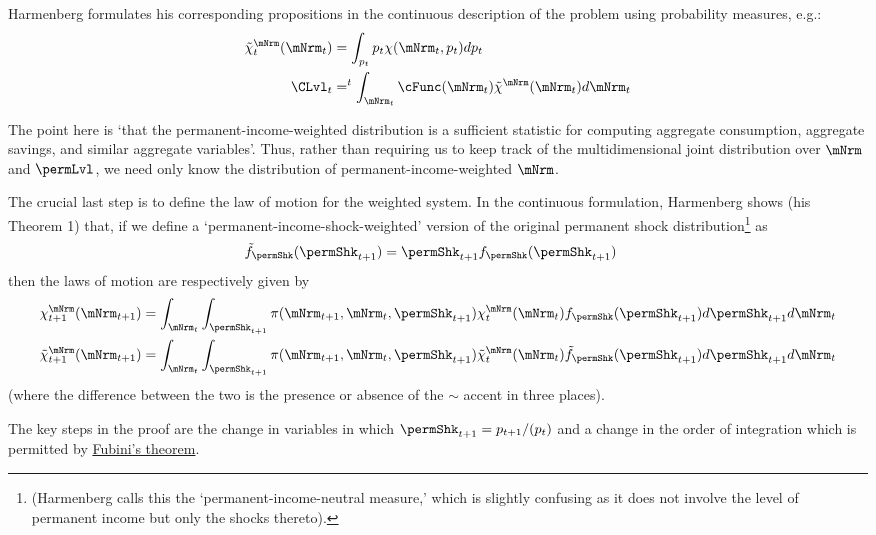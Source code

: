 \documentclass[\econtexRoot/BufferStockTheory]{subfiles}
\begin{document}
Harmenberg formulates his corresponding propositions in the continuous description of the problem using probability measures, e.g.:
\begin{align}
  \mpPrbMargWgt_{t}(\mNrmNow) & = \int_{\permLvlNow} \permLvlNow \mpPrb(\mNrmNow,\permLvlNow) d \permLvlNow
\\ \CLvl_{t} & = \PermGroFac^{t} \int_{\mNrmNow} \cFunc(\mNrmNow) \mpPrbMargWgt(\mNrmNow)                             d \mNrmNow
\end{align}

The point here is `that the permanent-income-weighted distribution is a sufficient statistic for computing aggregate consumption, aggregate savings, and similar aggregate variables'.
Thus, rather than requiring us to keep track of the multidimensional joint distribution over $\mNrm$ and $\permLvl$, we need only know the distribution of permanent-income-weighted $\mNrm$.

The crucial last step is to define the law of motion for the weighted system.
In the continuous formulation, Harmenberg shows (his Theorem 1) that, if we define a `permanent-income-shock-weighted' version of the original permanent shock distribution\footnote{(Harmenberg calls this the `permanent-income-neutral measure,' which is slightly confusing as it does not involve the level of permanent income but only the shocks thereto).} as
\begin{align}
  \permShkWgtPrb(\permShkPrbNxt) & = \permShkPrbNxt \permShkRawPrb(\permShkPrbNxt)
\end{align}
then the laws of motion are respectively given by 
\begin{equation}\begin{aligned}
  \mpPrbMargRaw_{t+1}(\mNrmNxt) & = \int_{\mNrmNow} \int_{\permShkPrbNxt} \lomdkPrb(\mNrmNxt,\mNrmNow,\permShkPrbNxt) \mpPrbMargRaw_{t}(\mNrmNow) \permShkRawPrb(\permShkPrbNxt) d \permShkPrbNxt d \mNrmNow
  \\
  \mpPrbMargWgt_{t+1}(\mNrmNxt) & = \int_{\mNrmNow} \int_{\permShkPrbNxt} \lomdkPrb(\mNrmNxt,\mNrmNow,\permShkPrbNxt) \mpPrbMargWgt_{t}(\mNrmNow) \permShkWgtPrb(\permShkPrbNxt) d \permShkPrbNxt d \mNrmNow
\end{aligned}\end{equation}
(where the difference between the two is the presence or absence of the $\sim$ accent in three places).

The key steps in the proof are the change in variables in which $\permShk_{t+1}=\permLvlNxt/(\PermGroFac \permLvlNow)$ and a change in the order of integration which is permitted by \href{https://en.wikipedia.org/wiki/Fubini\%27s_theorem}{Fubini's theorem}.
\end{document}
